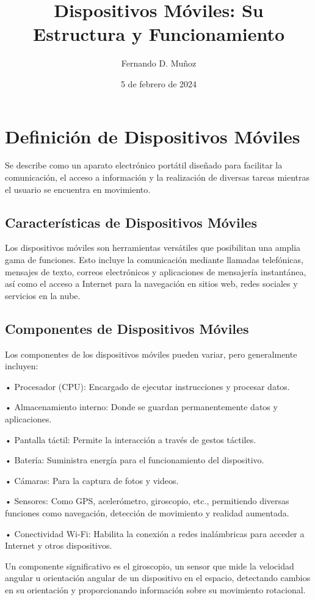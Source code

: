 \documentclass{article}
\title{Dispositivos Móviles: Su Estructura y Funcionamiento}
\author{Fernando D. Muñoz}
\date{5 de febrero de 2024}
\begin{document}
 
		
	\section{Definición de Dispositivos Móviles}
	Se describe como un aparato electrónico portátil diseñado para facilitar la comunicación, el acceso a información y la realización de diversas tareas mientras el usuario se encuentra en movimiento.
	
	\subsection{Características de Dispositivos Móviles}
	Los dispositivos móviles son herramientas versátiles que posibilitan una amplia gama de funciones. Esto incluye la comunicación mediante llamadas telefónicas, mensajes de texto, correos electrónicos y aplicaciones de mensajería instantánea, así como el acceso a Internet para la navegación en sitios web, redes sociales y servicios en la nube.
	
	\subsection{Componentes de Dispositivos Móviles}
	Los componentes de los dispositivos móviles pueden variar, pero generalmente incluyen:
	
	• Procesador (CPU): Encargado de ejecutar instrucciones y procesar datos.
	
	• Almacenamiento interno: Donde se guardan permanentemente datos y aplicaciones.
	
	• Pantalla táctil: Permite la interacción a través de gestos táctiles.
	
	• Batería: Suministra energía para el funcionamiento del dispositivo.
	
	• Cámaras: Para la captura de fotos y videos.
	
	• Sensores: Como GPS, acelerómetro, giroscopio, etc., permitiendo diversas funciones como navegación, detección de movimiento y realidad aumentada.
	
	• Conectividad Wi-Fi: Habilita la conexión a redes inalámbricas para acceder a Internet y otros dispositivos.
	
	Un componente significativo es el giroscopio, un sensor que mide la velocidad angular u orientación angular de un dispositivo en el espacio, detectando cambios en su orientación y proporcionando información sobre su movimiento rotacional.
	
\end{document}
